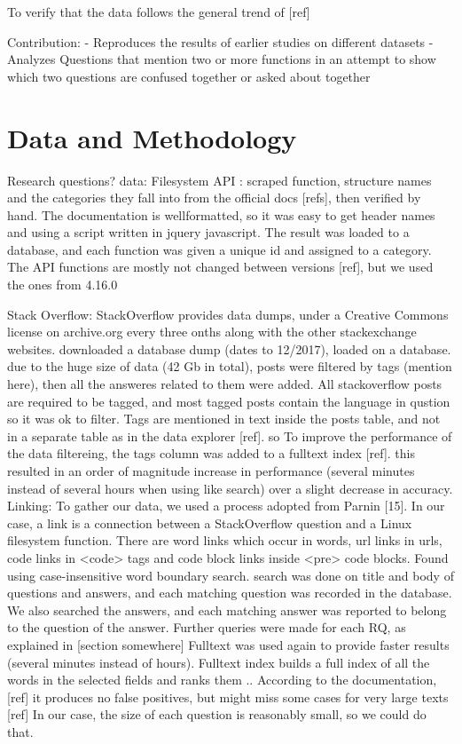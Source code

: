 To verify that the data follows the general trend of [ref]

Contribution:
- Reproduces the results of earlier studies on different datasets
- Analyzes Questions that mention two or more functions in an attempt to show which two questions are confused together or asked about together


\section{Data and Methodology}
Research questions?
data:
Filesystem API : scraped function, structure names and the categories they fall into from the official docs [refs], then verified by hand. The documentation is wellformatted, so it was easy to get header names and using a script written in jquery javascript. The result was loaded to a database, and each function was given a unique id and assigned to a category.
The API functions are mostly not changed between versions [ref], but we used the ones from 4.16.0

Stack Overflow: StackOverflow provides data dumps, under a Creative Commons license on archive.org every three onths along with the other stackexchange websites. downloaded a database dump (dates to 12/2017), loaded on a database. due to the huge size of data (42 Gb in total), posts were filtered by tags (mention here), then all the answeres related to them were added. All stackoverflow posts are required to be tagged, and most tagged posts contain the language in qustion so it was ok to filter. Tags are mentioned in text inside the posts table, and not in a separate table as in the data explorer [ref]. so To improve the performance of the data filtereing, the tags column was added to a fulltext index [ref]. this resulted in an order of magnitude increase in performance (several minutes instead of several hours when using like search) over a slight decrease in accuracy.
Linking: To gather our data, we used a process adopted from Parnin [15].
In our case, a link is a connection between a StackOverflow question and a Linux filesystem function. There are word links which occur in words, url links in urls, code links in <code> tags and code block links inside <pre> code blocks.
Found using case-insensitive word boundary search.
search was done on title and body of questions and answers, and each matching question was recorded in the database. We also searched the answers, and each matching answer was reported to belong to the question of the answer. Further queries were made for each RQ, as explained in [section somewhere]
Fulltext was used again to provide faster results (several minutes instead of hours). Fulltext index builds a full index of all the words in the selected fields and ranks them .. %
 According to the documentation, [ref] it produces no false positives, but might miss some cases for very large texts [ref]
In our case, the size of each question is reasonably small, so we could do that.

